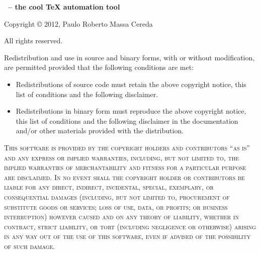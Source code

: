 \documentclass[a4paper,twoside,12pt]{memoir}
\begin{document}
\vspace{1.5em}

\ornamentline

\vfill

\begin{mdframed}[roundcorner=10pt,linecolor=araracolor,middlelinewidth=1pt]
\noindent
\begingroup
  \color{araracolor}\bfseries
  \arara \ -- the cool \TeX{} automation tool
\endgroup

\vspace{.5em}

\noindent Copyright \copyright{} 2012, Paulo Roberto Massa Cereda

\noindent All rights reserved.

\vspace{1em}

\noindent Redistribution and use in source and binary forms, with or without
modification, are permitted provided that the following conditions are met:

\vspace{1em}

\begin{itemize}
\item Redistributions of source code must retain the above copyright notice, 
      this list of conditions and the following disclaimer.
\item Redistributions in binary form must reproduce the above copyright notice,
      this list of conditions and the following disclaimer in the documentation
      and/or other materials provided with the distribution.
\end{itemize}

\vspace{1em}

\noindent\textsc{This software is provided by the copyright holders and 
contributors ``as is'' and any express or implied warranties, including, but not
 limited to, the implied warranties of merchantability and fitness for a 
particular purpose are disclaimed. In no event shall the copyright holder or 
contributors be liable for any direct, indirect, incidental, special, exemplary,
 or consequential damages (including, but not limited to, procurement of 
substitute goods or services; loss of use, data, or profits; or business 
interruption) however caused and on any theory of liability, whether in contract,
 strict liability, or tort (including negligence or otherwise) arising in any 
way out of the use of this software, even if advised of the possibility of such
damage.}
\end{mdframed}
\end{document}
